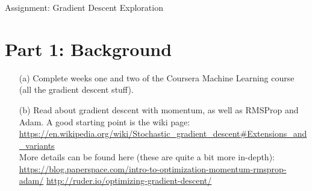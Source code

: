 \documentclass[12pt]{article}
\begin{document}
\begin{center}
\LARGE{Assignment: Gradient Descent Exploration}
\end{center}


\section*{Part 1: Background}
\begin{enumerate}
\item[(a)]
	Complete weeks one and two of the Coursera Machine Learning course (all the gradient descent stuff).


\item[(b)]
	Read about gradient descent with momentum, as well as RMSProp and Adam.  A good starting point is the wiki page:\\
	\url{https://en.wikipedia.org/wiki/Stochastic_gradient_descent#Extensions_and_variants}\\
	More details can be found here (these are quite a bit more in-depth):\\
	\url{https://blog.paperspace.com/intro-to-optimization-momentum-rmsprop-adam/}
	\url{http://ruder.io/optimizing-gradient-descent/}
\\\\
\end{enumerate}
\end{document}
